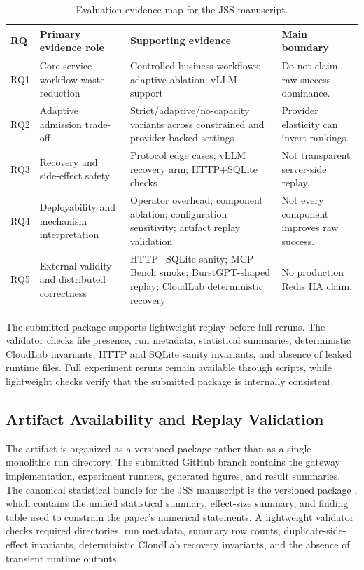 \documentclass[5p,times]{elsarticle}
\begin{document}
\begin{table}[t]
\centering
\caption{Evaluation evidence map for the JSS manuscript.}
\label{tab:evaluation_map}
\footnotesize
\begin{tabular}{@{}>{\raggedright\arraybackslash}p{}>{\raggedright\arraybackslash}p{}>{\raggedright\arraybackslash}p{}>{\raggedright\arraybackslash}p{}@{}}
\toprule
\textbf{RQ} & \textbf{Primary evidence role} & \textbf{Supporting evidence} & \textbf{Main boundary} \\
\midrule
RQ1 & Core service-workflow waste reduction & Controlled business workflows; adaptive ablation; vLLM support & Do not claim raw-success dominance. \\
RQ2 & Adaptive admission trade-off & Strict/adaptive/no-capacity variants across constrained and provider-backed settings & Provider elasticity can invert rankings. \\
RQ3 & Recovery and side-effect safety & Protocol edge cases; vLLM recovery arm; HTTP+SQLite checks & Not transparent server-side replay. \\
RQ4 & Deployability and mechanism interpretation & Operator overhead; component ablation; configuration sensitivity; artifact replay validation & Not every component improves raw success. \\
RQ5 & External validity and distributed correctness & HTTP+SQLite sanity; MCP-Bench smoke; BurstGPT-shaped replay; CloudLab deterministic recovery & No production Redis HA claim. \\
\bottomrule
\end{tabular}
\end{table}

The submitted package supports lightweight replay before full reruns. The validator checks file presence, run metadata, statistical summaries, deterministic CloudLab invariants, HTTP and SQLite sanity invariants, and absence of leaked runtime files. Full experiment reruns remain available through scripts, while lightweight checks verify that the submitted package is internally consistent.

\subsection{Artifact Availability and Replay Validation}

The artifact is organized as a versioned package rather than as a single monolithic run directory. The submitted GitHub branch contains the gateway implementation, experiment runners, generated figures, and result summaries. The canonical statistical bundle for the JSS manuscript is the versioned package , which contains the unified statistical summary, effect-size summary, and finding table used to constrain the paper's numerical statements. A lightweight validator checks required directories, run metadata, summary row counts, duplicate-side-effect invariants, deterministic CloudLab recovery invariants, and the absence of transient runtime outputs.
\end{document}
